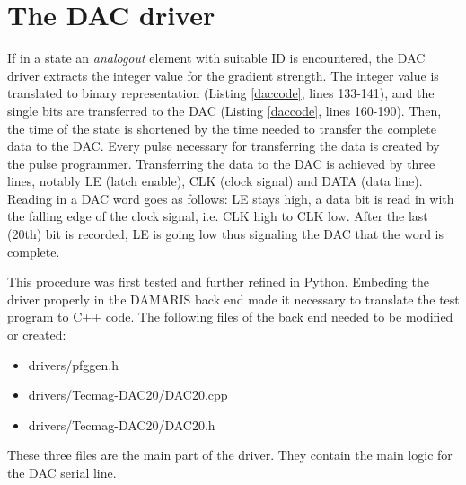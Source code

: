 \documentclass[12pt, a4paper, BCOR10mm, twoside, titlepage, headinclude]{scrbook}
\begin{document}
\section{The DAC driver}
If in a state an \emph{analogout} element with suitable ID is encountered, the DAC driver  extracts the integer value for the gradient strength. The integer value is translated to binary representation (Listing \ref{daccode}, lines 133-141), and the single bits are transferred to the DAC (Listing \ref{daccode}, lines 160-190). Then, the time of the state is shortened by the time needed to transfer the complete data to the DAC. Every pulse necessary for transferring the data is created by the pulse programmer.
Transferring the data to the DAC is achieved by three lines, notably LE (latch enable), CLK (clock signal) and DATA (data line). Reading in a DAC word goes as follows: LE stays high, a data bit is read in with the falling edge of the clock signal, i.e. CLK high to CLK low. After the last (20th) bit is recorded, LE is going low thus signaling the DAC that the word is complete.

This procedure was first tested and further refined in Python. Embeding the driver properly in the \textsf{DAMARIS} back end  made it necessary to translate the test program to \textsf{C++} \citep{Stroustrup:2000fk} code. The following files of the back end needed to be modified or created:
\begin{itemize}
\item drivers/pfggen.h
\item drivers/Tecmag-DAC20/DAC20.cpp
\item drivers/Tecmag-DAC20/DAC20.h
\end{itemize}
These three files are the main part of the driver. They contain the main logic for the DAC serial line.
\end{document}
